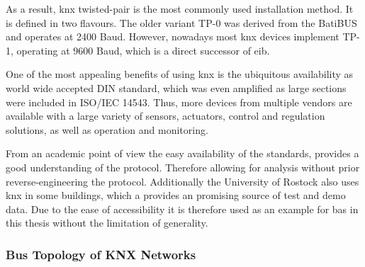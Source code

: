 As a result, \gls{knx} twisted-pair is the most commonly used installation method.
It is defined in two flavours. \parencite{DIN_EN_50090-5-2}
The older variant TP-0 was derived from the BatiBUS  and operates at 2400 Baud. However, nowadays most \gls{knx} devices implement TP-1, operating at 9600 Baud, which is a direct successor of \gls{eib}.

One of the most appealing benefits of using \gls{knx} is the ubiquitous availability as world wide accepted DIN standard, which was even amplified as large sections were included in ISO/IEC 14543.
Thus, more devices from multiple vendors are available with a large variety of sensors, actuators, control and regulation solutions, as well as operation and monitoring.

From an academic point of view the easy availability of the standards, provides a good understanding of the protocol. Therefore allowing for analysis without prior reverse-engineering the protocol.
Additionally the University of Rostock also uses \gls{knx} in some buildings, which a provides an promising source of test and demo data. \parencite[cf.][]{Mundt2012}
Due to the ease of accessibility it is therefore used as an example for \gls{bas} in this thesis without the limitation of generality.

\subsubsection{Bus Topology of KNX Networks}
\label{sec:background:bas:knx:topo}

